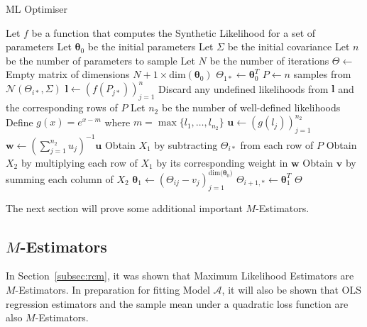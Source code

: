 \begin{singlespace}
\begin{algorithm}[H]
    \caption{ML Optimiser}
    \label{alg:ml}
    \begin{algorithmic}
        \State Let $f$ be a function that computes the Synthetic Likelihood for a set of parameters
        \State Let $\pmb{\theta}_0$ be the initial parameters
        \State Let $\Sigma$ be the initial covariance
        \State Let $n$ be the number of parameters to sample
        \State Let $N$ be the number of iterations
        \newline
            \State $\Theta \gets $ Empty matrix of dimensions $N + 1 \times \text{dim}(\pmb{\theta}_0)$
            \State $\Theta_{1*} \gets \pmb{\theta}_0^T$
                \State $P \gets n$ samples from $\mathcal{N}(\Theta_{i*}, \Sigma)$
                \State $\pmb{l} \gets (f(P_{j*}))_{j=1}^n$
                \State Discard any undefined likelihoods from $\pmb{l}$ and the corresponding rows of $P$
                \State Let $n_2$ be the number of well-defined likelihoods
                \State Define $g(x) = e^{x - m}$ where $m = \max{\{l_1, \ldots, l_{n_2}\}}$
                \State $\pmb{u} \gets (g(l_j))_{j=1}^{n_2}$
                \State $\pmb{w} \gets (\sum_{j=1}^{n_2} u_j)^{-1} \pmb{u}$
                \State Obtain $X_1$ by subtracting $\Theta_{i*}$ from each row of $P$
                \State Obtain $X_2$ by multiplying each row of $X_1$ by its corresponding weight in $\pmb{w}$
                \State Obtain $\pmb{v}$ by summing each column of $X_2$
                \State $\pmb{\theta}_1 \gets (\Theta_{ij} - v_j)_{j=1}^{\text{dim}{(\pmb{\theta}_0})}$
                \State $\Theta_{i+1, *} \gets \pmb{\theta}_1^T$
            \EndFor
            \State \Return $\Theta$
        \EndProcedure
    \end{algorithmic}
\end{algorithm}
\end{singlespace}

The next section will prove some additional important $M$-Estimators.

\subsection{\texorpdfstring{$M$}{M}-Estimators}

In Section~\ref{subsec:rcm}, it was shown that Maximum Likelihood Estimators are $M$-Estimators. In preparation for fitting Model $\mathcal{A}$, it will also be shown that OLS regression estimators and the sample mean under a quadratic loss function are also $M$-Estimators.

